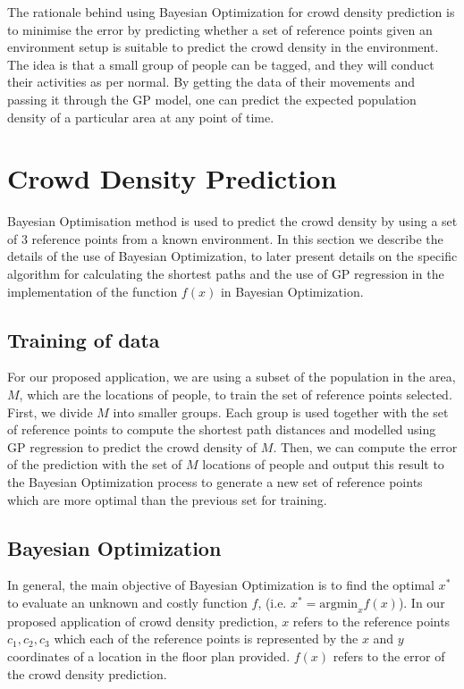\documentclass[letterpaper]{article}
\begin{document}
The rationale behind using Bayesian Optimization for crowd density prediction is to minimise the error by predicting whether a set of reference points given an environment setup is suitable to predict the crowd density in the environment. The idea is that a small group of people can be tagged, and they will conduct their activities as per normal. By getting the data of their movements and passing it through the GP model, one can predict the expected population density of a particular area at any point of time.

\section{Crowd Density Prediction}

Bayesian Optimisation method is used to predict the crowd density by using a set of $3$ reference points from a known environment. In this section we describe the details of the use of Bayesian Optimization, to later present details on the specific algorithm for calculating the shortest paths and the use of GP regression in the implementation of the function $f(x)$ in Bayesian Optimization.

\subsection{Training of data}

For our proposed application, we are using a subset of the population in the area, $M$, which are the locations of people, to train the set of reference points selected. First, we divide $M$ into smaller groups. Each group is used together with the set of reference points to compute the shortest path distances and modelled using GP regression to predict the crowd density of $M$. Then, we can compute the error of the prediction with the set of $M$ locations of people and output this result to the Bayesian Optimization process to generate a new set of reference points which are more optimal than the previous set for training.

\subsection{Bayesian Optimization}

In general, the main objective of Bayesian Optimization is to find the optimal $x^*$ to evaluate an unknown and costly function $f$, (i.e. $x^* = \text{argmin}_x f(x)$). In our proposed application of crowd density prediction, $x$ refers to the reference points $c_1, c_2, c_3$ which each of the reference points is represented by the $x$ and $y$ coordinates of a location in the floor plan provided. $f(x)$ refers to the error of the crowd density prediction. \\
\end{document}

